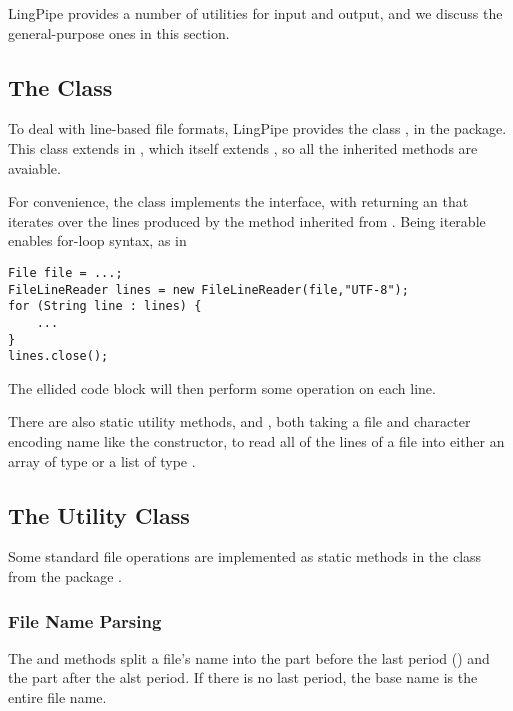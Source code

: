 LingPipe provides a number of utilities for input and output,
and we discuss the general-purpose ones in this section.  

\subsection{The  Class}\label{section:io-file-line-reader}

To deal with line-based file formats, LingPipe provides the class
, in the  package.  This
class extends  in , which itself
extends , so all the inherited methods are
avaiable.  

For convenience, the  class implements the
 interface, with  returning an
 that iterates over the lines produced by the
 method inherited from .  Being
iterable enables for-loop syntax, as in
%
\begin{verbatim}
File file = ...;
FileLineReader lines = new FileLineReader(file,"UTF-8");
for (String line : lines) {
    ...
}
lines.close();
\end{verbatim}
%
The ellided code block will then perform some operation on each line.

There are also static utility methods,  and
, both taking a file and character encoding
name like the constructor, to read all of the lines of a file into
either an array of type  or a list of type
.

\subsection{The  Utility Class}

Some standard file operations are implemented as static methods
in the  class from the package .

\subsubsection{File Name Parsing}

The  and  methods split a
file's name into the part before the last period () and the
part after the alst period.  If there is no last period, the base name
is the entire file name.

